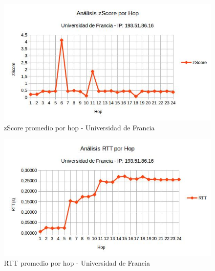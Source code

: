 \bigskip

\begin{figure}[H]
\centering
\includegraphics[width=1\textwidth]{graficos/zScore_Francia.jpg}
\caption{zScore promedio por hop - Universidad de Francia}
\label{francia_zs}
\end{figure}

\begin{figure}[H]
\centering
\includegraphics[width=1\textwidth]{graficos/rTT_Francia.jpg}
\caption{RTT promedio por hop - Universidad de Francia}
\label{francia_rtt}
\end{figure}